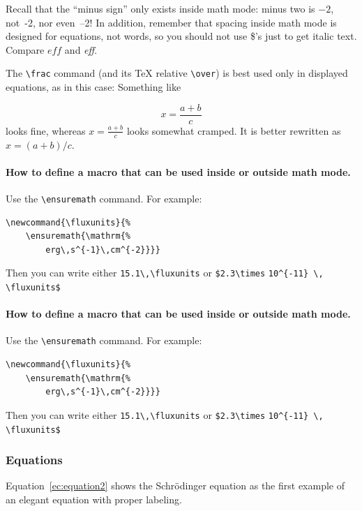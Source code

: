 \documentclass[9pt,twoside]{rmaa-rho-class/rmaa-rho}
\newcommand{\CS}[1]{\texttt{\textbackslash #1}}
\begin{document}
        Recall that the ``minus sign'' only exists inside math mode: minus two is $-2$, not~-2, nor \hbox{even --2!} In addition, remember that spacing inside math mode is designed for equations, not words, so you should not use \$'s just to get italic text. Compare $eff$ and \textit{eff}. 
    
        The \CS{frac} command (and its \TeX{} relative \CS{over}) is best used only in displayed equations, as in this case: Something like 
    
        \begin{equation} \label{ec:Equation1}
            x = \frac { a + b } { c } 
        \end{equation}
    looks fine, whereas $x = \frac { a + b } { c }$ looks somewhat cramped. It is better rewritten as $x = (a + b) / c $. 
    
        \paragraph{How to define a macro that can be used inside or outside math mode.} Use the \CS{ensuremath} command. For example: 
    
\begin{verbatim}
\newcommand{\fluxunits}{%
    \ensuremath{\mathrm{%
        erg\,s^{-1}\,cm^{-2}}}}
\end{verbatim}
    
        Then you can write either \verb+15.1\,\fluxunits+ or \verb+$2.3\times+ \verb+10^{-11} \,+ \verb+\fluxunits$+
    
        \paragraph{How to define a macro that can be used inside or outside math mode.} Use the \CS{ensuremath} command. For example: 
        
\begin{verbatim}
\newcommand{\fluxunits}{%
    \ensuremath{\mathrm{%
        erg\,s^{-1}\,cm^{-2}}}}
\end{verbatim}
    
        Then you can write either \verb+15.1\,\fluxunits+ or \verb+$2.3\times+ \verb+10^{-11} \,+ \verb+\fluxunits$+

    \subsubsection{Equations}

        Equation~\ref{ec:equation2} shows the Schrödinger equation as the first example of an elegant equation with proper labeling.
\end{document}
